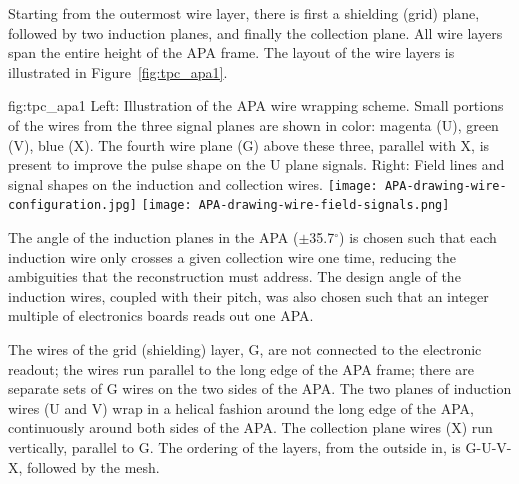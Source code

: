 Starting from the outermost wire layer, 
there is first a shielding (grid) plane, followed by two induction planes, and finally the collection plane. All wire layers span the entire height of the APA frame. The layout of the wire layers is illustrated in  Figure~\ref{fig:tpc_apa1}.

\begin{dunefigure}{fig:tpc_apa1}
{Left: Illustration of the APA wire wrapping scheme. Small portions of the wires from the three signal planes are shown in color: magenta (U), green (V), blue (X). The fourth wire plane (G) above these three, parallel with X, is present to improve the pulse shape on the U plane signals.  Right: Field lines and signal shapes on the induction and collection wires. 
}
\texttt{[image: APA-drawing-wire-configuration.jpg]} 
\texttt{[image: APA-drawing-wire-field-signals.png]} 
\end{dunefigure}

The angle of the induction planes in the APA ($\pm$35.7$^{\circ}$) is chosen such that each induction wire only crosses a given collection wire one time, reducing the ambiguities that the reconstruction must address.  The design angle of the induction wires, coupled with their pitch, was also chosen such that an integer multiple of electronics boards reads out one APA.

The wires of the grid (shielding) layer, G,  are not connected to the electronic readout; the wires run parallel to the long edge of the APA frame; there are separate sets of G wires on the two sides of the APA. 
 The two planes of induction wires (U and V) wrap in a helical fashion around the long edge of the APA, continuously around both sides of the APA.  The collection plane wires (X) run vertically, parallel to G.   The ordering of the layers, from the outside in, is G-U-V-X, followed by the mesh.   

